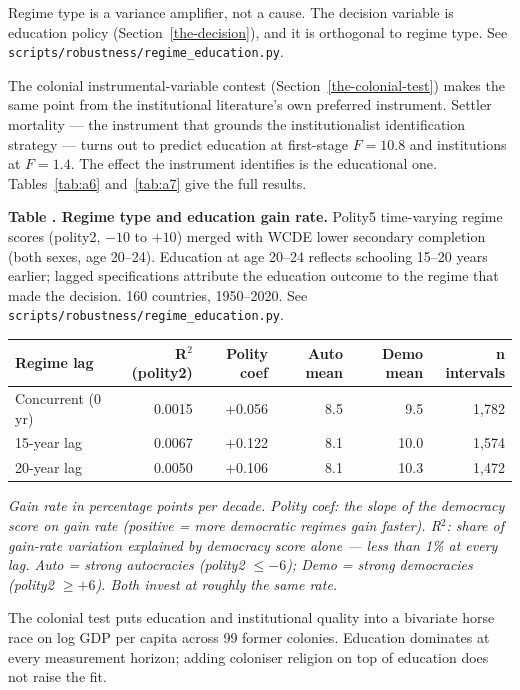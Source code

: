 \documentclass[12pt,letterpaper]{article}
\begin{document}
{Regime type is a variance amplifier, not a cause. The decision variable is education policy (Section~\ref{the-decision}), and it is orthogonal to regime type. See \texttt{scripts/robustness/regime\_education.py}.

The colonial instrumental-variable contest (Section~\ref{the-colonial-test}) makes the same point from the institutional literature's own preferred instrument. Settler mortality --- the instrument that grounds the institutionalist identification strategy --- turns out to predict education at first-stage $F = 10.8$ and institutions at $F = 1.4$. The effect the instrument identifies is the educational one. Tables~\ref{tab:a6} and~\ref{tab:a7} give the full results.

\label{tab:a5}\textbf{Table \thetable. Regime type and education gain rate.} Polity5
time-varying regime scores (polity2, $-10$ to $+10$) merged with WCDE
lower secondary completion (both sexes, age 20--24). Education at age
20--24 reflects schooling 15--20 years earlier; lagged specifications
attribute the education outcome to the regime that made the decision.
160 countries, 1950--2020. See
\texttt{scripts/robustness/regime\_education.py}.

{\small
\begin{longtable}[]{@{}lrrrrr@{}}
\toprule
Regime lag & R$^2$(polity2) & Polity coef & Auto mean & Demo mean & n intervals \\
\midrule
\endhead
Concurrent (0 yr) & 0.0015 & $+$0.056 & 8.5 & 9.5 & 1,782 \\
15-year lag & 0.0067 & $+$0.122 & 8.1 & 10.0 & 1,574 \\
20-year lag & 0.0050 & $+$0.106 & 8.1 & 10.3 & 1,472 \\
\bottomrule
\end{longtable}
}

\emph{Gain rate in percentage points per decade. Polity coef: the slope
of the democracy score on gain rate (positive = more democratic
regimes gain faster). R$^2$: share of gain-rate variation explained by
democracy score alone --- less than 1\% at every lag. Auto = strong
autocracies (polity2 $\leq -6$); Demo = strong democracies (polity2
$\geq +6$). Both invest at roughly the same rate.}

\noindent The colonial test puts education and institutional quality
into a bivariate horse race on log GDP per capita across 99 former
colonies. Education dominates at every measurement horizon; adding
coloniser religion on top of education does not raise the fit.

}
\end{document}
